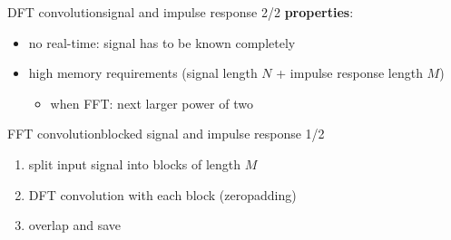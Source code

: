 \begin{frame}{DFT convolution}{signal and impulse response 2/2}
	\textbf{properties}:
	\begin{itemize}
		\item	no real-time: signal has to be known completely
		\item	high memory requirements (signal length $N$ + impulse response length $M$)
		\begin{itemize}
            \item	when FFT: next larger power of two
        \end{itemize}
	\end{itemize}
\end{frame}

\begin{frame}{FFT convolution}{blocked signal and impulse response 1/2}
	\begin{enumerate}
		\item	split input signal into blocks of length $M$
		\item	DFT convolution with each block (zeropadding)
		\item	overlap and save
	\end{enumerate}
\end{frame}
